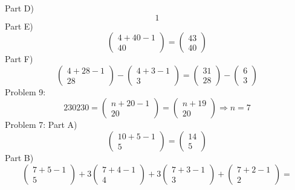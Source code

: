 \documentclass{article}
\begin{document}
	Part D)
	$$
	1
	$$
	Part E)
	$$
	\left(\begin{array}{c}
	4+40-1\\
	40
	\end{array}\right)
	=
	\left(\begin{array}{c}
	43\\
	40
	\end{array}\right)
	$$
	Part F)
	$$
	\left(\begin{array}{c}
	4+28-1\\
	28
	\end{array}\right)
	-
	\left(\begin{array}{c}
	4+3-1\\
	3
	\end{array}\right)
	=
	\left(\begin{array}{c}
	31\\
	28
	\end{array}\right)
	-
	\left(\begin{array}{c}
	6\\
	3
	\end{array}\right)
	$$
	Problem 9:
	$$
	230230 = 
	\left(\begin{array}{c}
	n+20-1\\
	20
	\end{array}\right)
	=
	\left(\begin{array}{c}
	n+19\\
	20
	\end{array}\right)
	\Rightarrow
	n=7
	$$
	Problem 7: Part A)
	$$
	\left(\begin{array}{c}
	10+5-1\\
	5
	\end{array}\right)
	=
	\left(\begin{array}{c}
	14\\
	5
	\end{array}\right)
	$$
	Part B)
	$$
	\left(\begin{array}{c}
	7+5-1\\
	5
	\end{array}\right)
	+
	3
	\left(\begin{array}{c}
	7+4-1\\
	4
	\end{array}\right)
	+
	3
	\left(\begin{array}{c}
	7+3-1\\
	3
	\end{array}\right)
	+
	\left(\begin{array}{c}
	7+2-1\\
	2
	\end{array}\right)
	=
	$$
\end{document}
